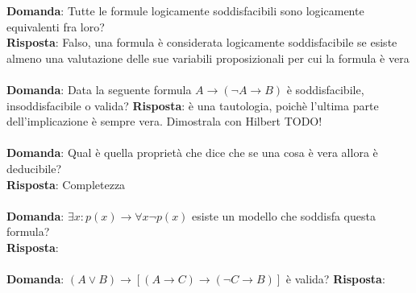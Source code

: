 \documentclass{article}
\begin{document}
\textbf{Domanda}: Tutte le formule logicamente soddisfacibili sono logicamente equivalenti fra loro? \\
\textbf{Risposta}: Falso, una formula è considerata logicamente soddisfacibile se esiste almeno una valutazione delle sue variabili proposizionali per cui la formula è vera \\ \\
\textbf{Domanda}: Data la seguente formula $A \to (\lnot A \to B)$ è soddisfacibile, insoddisfacibile o valida?
\textbf{Risposta}: è una tautologia, poichè l'ultima parte dell'implicazione è sempre vera. Dimostrala con Hilbert TODO! \\ \\
\textbf{Domanda}: Qual è quella proprietà che dice che se una cosa è vera allora è deducibile? \\
\textbf{Risposta}: Completezza \\ \\
\textbf{Domanda}: $\exists x: p(x) \to \forall x \lnot p(x)$ esiste un modello che soddisfa questa formula? \\
\textbf{Risposta}: \\ \\
\textbf{Domanda}: $(A \lor B) \to [(A \to C) \to (\lnot C \to B)]$ è valida?
\textbf{Risposta}:  \\ \\
\end{document}
